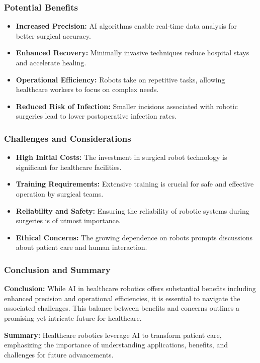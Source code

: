 \documentclass[aspectratio=169]{beamer}
\begin{document}
\begin{frame}[fragile]
    \frametitle{Potential Benefits}
    
    \begin{itemize}
        \item \textbf{Increased Precision:} AI algorithms enable real-time data analysis for better surgical accuracy.
        \item \textbf{Enhanced Recovery:} Minimally invasive techniques reduce hospital stays and accelerate healing.
        \item \textbf{Operational Efficiency:} Robots take on repetitive tasks, allowing healthcare workers to focus on complex needs.
        \item \textbf{Reduced Risk of Infection:} Smaller incisions associated with robotic surgeries lead to lower postoperative infection rates.
    \end{itemize}
\end{frame}

\begin{frame}[fragile]
    \frametitle{Challenges and Considerations}
    
    \begin{itemize}
        \item \textbf{High Initial Costs:} The investment in surgical robot technology is significant for healthcare facilities.
        \item \textbf{Training Requirements:} Extensive training is crucial for safe and effective operation by surgical teams.
        \item \textbf{Reliability and Safety:} Ensuring the reliability of robotic systems during surgeries is of utmost importance.
        \item \textbf{Ethical Concerns:} The growing dependence on robots prompts discussions about patient care and human interaction.
    \end{itemize}
\end{frame}

\begin{frame}[fragile]
    \frametitle{Conclusion and Summary}
    
    \textbf{Conclusion:} While AI in healthcare robotics offers substantial benefits including enhanced precision and operational efficiencies, it is essential to navigate the associated challenges. This balance between benefits and concerns outlines a promising yet intricate future for healthcare.
    
    \vspace{0.5cm}
    
    \textbf{Summary:} Healthcare robotics leverage AI to transform patient care, emphasizing the importance of understanding applications, benefits, and challenges for future advancements.
\end{frame}
\end{document}
